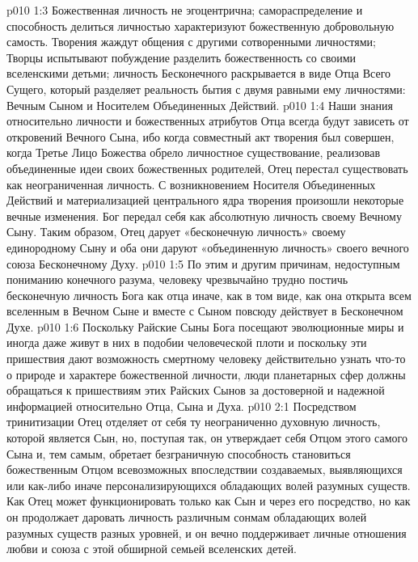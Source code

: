 \vs p010 1:3 \pc Божественная личность не эгоцентрична; самораспределение и способность делиться личностью характеризуют божественную добровольную самость. Творения жаждут общения с другими сотворенными личностями; Творцы испытывают побуждение разделить божественность со своими вселенскими детьми; личность Бесконечного раскрывается в виде Отца Всего Сущего, который разделяет реальность бытия с двумя равными ему личностями: Вечным Сыном и Носителем Объединенных Действий.
\vs p010 1:4 \pc Наши знания относительно личности и божественных атрибутов Отца всегда будут зависеть от откровений Вечного Сына, ибо когда совместный акт творения был совершен, когда Третье Лицо Божества обрело личностное существование, реализовав объединенные идеи своих божественных родителей, Отец перестал существовать как неограниченная личность. С возникновением Носителя Объединенных Действий и материализацией центрального ядра творения произошли некоторые вечные изменения. Бог передал себя как абсолютную личность своему Вечному Сыну. Таким образом, Отец дарует «бесконечную личность» своему единородному Сыну и оба они даруют «объединенную личность» своего вечного союза Бесконечному Духу.
\vs p010 1:5 По этим и другим причинам, недоступным пониманию конечного разума, человеку чрезвычайно трудно постичь бесконечную личность Бога как отца иначе, как в том виде, как она открыта всем вселенным в Вечном Сыне и вместе с Сыном повсюду действует в Бесконечном Духе.
\vs p010 1:6 Поскольку Райские Сыны Бога посещают эволюционные миры и иногда даже живут в них в подобии человеческой плоти и поскольку эти пришествия дают возможность смертному человеку действительно узнать что\hyp{}то о природе и характере божественной личности, люди планетарных сфер должны обращаться к пришествиям этих Райских Сынов за достоверной и надежной информацией относительно Отца, Сына и Духа.
\vs p010 2:1 Посредством тринитизации Отец отделяет от себя ту неограниченно духовную личность, которой является Сын, но, поступая так, он утверждает себя Отцом этого самого Сына и, тем самым, обретает безграничную способность становиться божественным Отцом всевозможных впоследствии создаваемых, выявляющихся или как\hyp{}либо иначе персонализирующихся обладающих волей разумных существ. Как  Отец может функционировать только как Сын и через его посредство, но как  он продолжает даровать личность различным сонмам обладающих волей разумных существ разных уровней, и он вечно поддерживает личные отношения любви и союза с этой обширной семьей вселенских детей.
